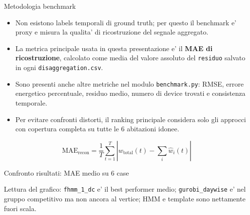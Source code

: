 \documentclass[aspectratio=169]{beamer}
\newcommand{\code}[1]{\texttt{#1}}
\begin{document}
\begin{frame}{Metodologia benchmark}
\small
\begin{itemize}
  \item Non esistono labels temporali di ground truth; per questo il benchmark e' proxy e misura la qualita' di ricostruzione del segnale aggregato.
  \item La metrica principale usata in questa presentazione e' il \textbf{MAE di ricostruzione}, calcolato come media del valore assoluto del \code{residuo} salvato in ogni \code{disaggregation.csv}.
  \item Sono presenti anche altre metriche nel modulo \code{benchmark.py}: RMSE, errore energetico percentuale, residuo medio, numero di device trovati e consistenza temporale.
  \item Per evitare confronti distorti, il ranking principale considera solo gli approcci con copertura completa su tutte le 6 abitazioni idonee.
\end{itemize}

\vspace{0.4em}
\[
\mathrm{MAE}_{\mathrm{recon}} = \frac{1}{T}\sum_{t=1}^{T}
\left|w_{\mathrm{total}}(t) - \sum_i \widehat{w}_i(t)\right|
\]
\end{frame}

\begin{frame}{Confronto risultati: MAE medio su 6 case}
\small
\begin{center}
\end{center}

\vspace{-0.2em}
\tiny
Lettura del grafico: \code{fhmm\_1\_dc} e' il best performer medio; \code{gurobi\_daywise} e' nel gruppo competitivo ma non ancora al vertice; HMM e template sono nettamente fuori scala.
\end{frame}
\end{document}
